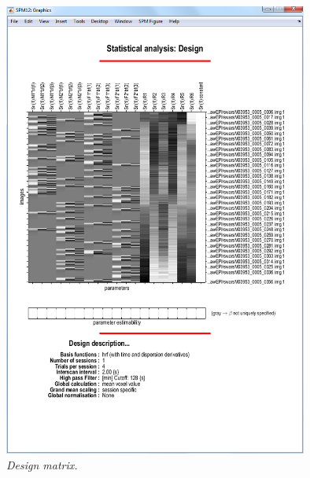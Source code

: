 \documentclass[a4paper,titlepage]{book}
\begin{document}
\begin{figure}
\begin{center}
\includegraphics[width=100mm]{faces/cat_design}
\caption{\em Design matrix. \label{cat_design}}
\end{center}
\end{figure}
\end{document}
